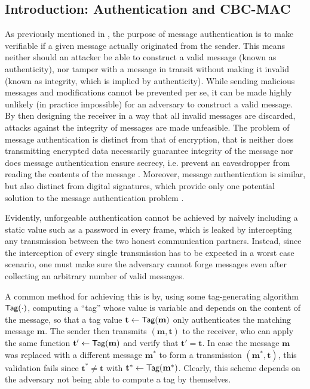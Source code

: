 \subsection{Introduction: Authentication and CBC-MAC}
\label{sec:uplink_mac_introduction}
As previously mentioned in , the purpose of message authentication is to make verifiable if a given message actually originated from the sender.
This means neither should an attacker be able to construct a valid message (known as authenticity), nor tamper with a message in transit without making it invalid (known as integrity, which is implied by authenticity).
While sending malicious messages and modifications cannot be prevented per se, it can be made highly unlikely (in practice impossible) for an adversary to construct a valid message.
By then designing the receiver in a way that all invalid messages are discarded, attacks against the integrity of messages are made unfeasible.
The problem of message authentication is distinct from that of encryption, that is neither does transmitting encrypted data necessarily guarantee integrity of the message nor does message authentication ensure secrecy, i.e. prevent an eavesdropper from reading the contents of the message \cite[Section 4.1.2]{moderncryptography}.
Moreover, message authentication is similar, but also distinct from digital signatures, which provide only one potential solution to the message authentication problem \cite[Section 1.1.3]{foundationsofcryptography}.

Evidently, unforgeable authentication cannot be achieved by naively including a static value such as a password in every frame, which is leaked by intercepting any transmission between the two honest communication partners.
Instead, since the interception of every single transmission has to be expected in a worst case scenario, one must make sure the adversary cannot forge messages even after collecting an arbitrary number of valid messages.

A common method for achieving this is by, using some tag-generating algorithm $\operatorname{\textsf{Tag}}(\cdot)$, computing a ``tag'' whose value is variable and depends on the content of the message, so that a tag value $\mathbf t \leftarrow \operatorname{\textsf{Tag}}(\mathbf m)$ only authenticates the matching message $\mathbf m$.
The sender then transmits $(\mathbf m, \mathbf t)$ to the receiver, who can apply the same function $\mathbf t' \leftarrow \operatorname{\textsf{Tag}}(\mathbf m)$ and verify that $\mathbf t' = \mathbf t$.
In case the message $\mathbf m$ was replaced with a different message $\mathbf m^*$ to form a transmission $(\mathbf m^*, \mathbf t)$, this validation fails since $\mathbf t^* \neq \mathbf t$ with $\mathbf t^* \leftarrow \operatorname{\textsf{Tag}}(\mathbf m^*)$.
Clearly, this scheme depends on the adversary not being able to compute a tag by themselves.

